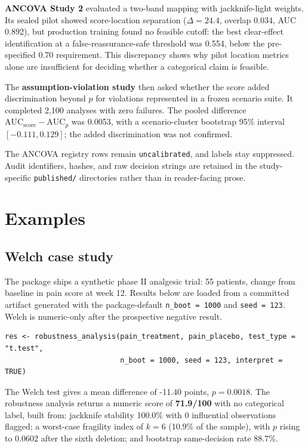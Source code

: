 \textbf{ANCOVA Study 2} evaluated a two-band mapping with jackknife-light weights.
Its sealed pilot showed score-location separation (\(\Delta=24.4\), overlap
0.034, AUC 0.892), but production training found no feasible cutoff: the best
clear-effect identification at a false-reassurance-safe threshold was 0.554,
below the pre-specified 0.70 requirement. This discrepancy shows why pilot
location metrics alone are insufficient for deciding whether a categorical
claim is feasible.

The \textbf{assumption-violation study} then asked whether the score added
discrimination beyond \(p\) for violations represented in a frozen scenario
suite. It completed 2,100 analyses with zero failures. The pooled difference
\(\mathrm{AUC}_\mathrm{score}-\mathrm{AUC}_p\) was 0.0053, with a
scenario-cluster bootstrap 95\% interval \([-0.111,0.129]\); the added
discrimination was not confirmed.

The ANCOVA registry rows remain \texttt{uncalibrated}, and labels stay suppressed.
Audit identifiers, hashes, and raw decision strings are retained in the
study-specific \texttt{published/} directories rather than in reader-facing prose.

\section{Examples}\label{examples}

\subsection{Welch case study}\label{welch-case-study}

The package ships a synthetic phase II analgesic trial: 55 patients, change
from baseline in pain score at week 12. Results below are loaded from a
committed artifact generated with the package-default \texttt{n\_boot\ =\ 1000} and
\texttt{seed\ =\ 123}. Welch is numeric-only after the prospective negative result.

\begin{verbatim}
res <- robustness_analysis(pain_treatment, pain_placebo, test_type = "t.test",
                           n_boot = 1000, seed = 123, interpret = TRUE)
\end{verbatim}

The Welch test gives a mean difference of -11.40
points, \(p = 0.0018\). The robustness analysis
returns a numeric score of \textbf{71.9/100} with no
categorical label, built
from: jackknife stability 100.0\% with
0 influential observations flagged; a
worst-case fragility index of \(k = 6\)
(10.9\% of the sample), with \(p\) rising to
0.0602 after the sixth deletion; and bootstrap
same-decision rate 88.7\%.

